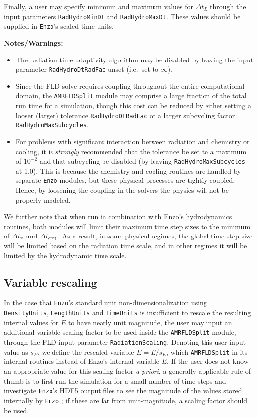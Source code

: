 \documentclass[letterpaper,10pt]{article}
\renewcommand{\(}{\left(}
\renewcommand{\)}{\right)}
\newcommand{\dt}{\Delta t}
\newcommand{\enzo}{{\tt Enzo} }
\begin{document}
Finally, a user may specify minimum and maximum values for $\dt_E$
through the input parameters {\tt RadHydroMinDt} and 
{\tt RadHydroMaxDt}.  These values should be supplied in {\tt Enzo}'s
scaled time units.


{\bf Notes/Warnings:}
\begin{itemize}
\item The radiation time adaptivity algorithm may be disabled by
  leaving the input parameter {\tt RadHydroDtRadFac} unset (i.e.~set
  to $\infty$).
\item Since the FLD solve requires coupling throughout the entire
  computational domain, the {\tt AMRFLDSplit} module may comprise a
  large fraction of the total run time for a simulation, though this 
  cost can be reduced by either setting a looser (larger) tolerance
  {\tt RadHydroDtRadFac} or a larger subcycling factor {\tt
    RadHydroMaxSubcycles}. 
\item For problems with significant interaction between radiation and
  chemistry or cooling, it is {\em strongly} recommended that the
  tolerance be set to a maximum of $10^{-2}$ and that subcycling be
  disabled (by leaving {\tt RadHydroMaxSubcycles} at 1.0).  This is
  because the chemistry and cooling routines are handled by separate
  \enzo modules, but these physical processes are tightly coupled.
  Hence, by loosening the coupling in the solvers the physics will not
  be properly modeled.
\end{itemize}


We further note that when run in combination with Enzo's hydrodynamics
routines, both modules will limit their maximum time step sizes to the
minimum of $\dt_{\text{E}}$ and $\dt_{\text{CFL}}$.  As a result, in
some physical regimes, the global time step size will be limited based
on the radiation time scale, and in other regimes it will be limited
by the hydrodynamic time scale. 




\subsection{Variable rescaling}
\label{sec:AMRFLDSplit_variable_rescaling}

In the case that {\tt Enzo}'s standard unit non-dimensionalization
using {\tt DensityUnits}, {\tt LengthUnits} and {\tt TimeUnits} is
insufficient to rescale the resulting internal values for $E$ to have
nearly unit magnitude, the user may input an additional variable
scaling factor to be used inside the {\tt AMRFLDSplit} module, through
the FLD input parameter {\tt RadiationScaling}.  Denoting this
user-input value as $s_E$, we define the rescaled variable $\tilde{E}
= E / s_E$, which {\tt AMRFLDSplit} in its internal routines instead
of Enzo's internal variable $E$.  If the user does not know an
appropriate value for this scaling factor {\em a-priori}, a
generally-applicable rule of thumb is to first run the simulation for
a small number of time steps and investigate {\tt Enzo}'s HDF5 output
files to see the magnitude of the values stored internally by \enzo;
if these are far from unit-magnitude, a scaling factor should be used. 
\end{document}
